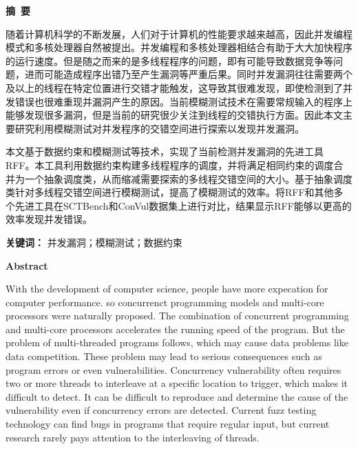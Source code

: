 \cleardoublepage{}
\begin{center}
    \bfseries {} 摘~要
\end{center}

随着计算机科学的不断发展，人们对于计算机的性能要求越来越高，因此并发编程模式和多核处理器自然被提出。并发编程和多核处理器相结合有助于大大加快程序的运行速度。但是随之而来的是多线程程序的问题，即有可能导致数据竞争等问题，进而可能造成程序出错乃至产生漏洞等严重后果。同时并发漏洞往往需要两个及以上的线程在特定位置进行交错才能触发，这导致其很难发现，即使检测到了并发错误也很难重现并漏洞产生的原因。当前模糊测试技术在需要常规输入的程序上能够发现很多漏洞，但是当前的研究很少关注到线程的交错执行方面。因此本文主要研究利用模糊测试对并发程序的交错空间进行探索以发现并发漏洞。


本文基于数据约束和模糊测试等技术，实现了当前检测并发漏洞的先进工具RFF。本工具利用数据约束构建多线程程序的调度，并将满足相同约束的调度合并为一个抽象调度类，从而缩减需要探索的多线程交错空间的大小。基于抽象调度类针对多线程交错空间进行模糊测试，提高了模糊测试的效率。将RFF和其他多个先进工具在SCTBench和ConVul数据集上进行对比，结果显示RFF能够以更高的效率发现并发错误。

\textbf{关键词：} 并发漏洞；模糊测试；数据约束

\cleardoublepage{}
\begin{center}
    \bfseries {} Abstract
\end{center}

With the development of computer science, people have more expecation for computer performance. so concurrenct programming models and multi-core processors were naturally proposed. The combination of concurrent programming and multi-core processors accelerates the running speed of the program. But the problem of multi-threaded programs follows, which may cause data problems like data competition. These problem may lead to serious consequences such as program errors or even vulnerabilities. Concurrency vulnerability often requires two or more threads to interleave at a specific location to trigger, which makes it difficult to detect. It can be difficult to reproduce and determine the cause of the vulnerability even if concurrency errors are detected. Current fuzz testing technology can find bugs in programs that require regular input, but current research rarely pays attention to the interleaving of threads.

